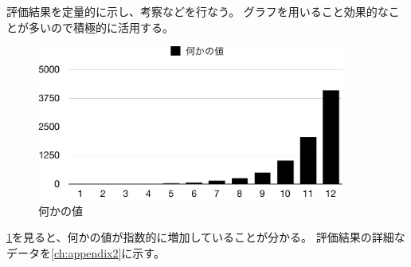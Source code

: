 評価結果を定量的に示し、考察などを行なう。
グラフを用いること効果的なことが多いので積極的に活用する。

\begin{figure}[ht]
  \centering
  \includegraphics[width=0.9\textwidth]{examples/graphs/example}
  \caption{何かの値}\label{fig:example}
\end{figure}

\cref{fig:example}を見ると、何かの値が指数的に増加していることが分かる。
評価結果の詳細なデータを\cref{ch:appendix2}に示す。
